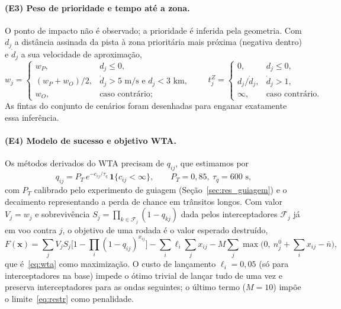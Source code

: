 \documentclass[11pt,a4paper]{article}
\begin{document}
\paragraph{(E3) Peso de prioridade e tempo até a zona.} O ponto de impacto não é observado; a prioridade é inferida pela
geometria. Com $d_j$ a distância assinada da pista à zona prioritária mais próxima (negativa dentro) e $\dot d_j$ a sua
velocidade de aproximação,
\begin{equation}
  w_j=\begin{cases} w_P, & d_j\le 0,\\ (w_P+w_O)/2, & \dot d_j>5\text{ m/s e } d_j<3\text{ km},\\ w_O, & \text{caso contrário;}\end{cases}
  \qquad
  t^Z_j=\begin{cases}0, & d_j\le0,\\ d_j/\dot d_j, & \dot d_j>1,\\ \infty,&\text{caso contrário.}\end{cases}
  \label{eq:peso}
\end{equation}
As fintas do conjunto de cenários foram desenhadas para enganar exatamente essa inferência.

\paragraph{(E4) Modelo de sucesso e objetivo WTA.} Os métodos derivados do WTA precisam de $q_{ij}$, que estimamos por
\begin{equation}
  q_{ij} = P_T\,e^{-c_{ij}/\tau_q}\,\mathbf{1}\{c_{ij}<\infty\},\qquad P_T=0{,}85,\ \tau_q=600\text{ s},
  \label{eq:q}
\end{equation}
com $P_T$ calibrado pelo experimento de guiagem (Seção~\ref{sec:res_guiagem}) e o decaimento representando a perda de
chance em trânsitos longos. Com valor $V_j=w_j$ e sobrevivência $S_j=\prod_{k\in\mathcal{F}_j}(1-q_{kj})$ dada pelos
interceptadores $\mathcal{F}_j$ já em voo contra $j$, o objetivo de uma rodada é o valor esperado destruído,
\begin{equation}
  F(\bm{x}) = \sum_j V_j S_j\Big[1-\prod_{i}(1-q_{ij})^{x_{ij}}\Big]
  - \sum_{i}\ell_i\sum_j x_{ij}
  - M\sum_j\max\!\Big(0,\ n_j^0+\sum_i x_{ij}-\bar n\Big),
  \label{eq:F}
\end{equation}
que é~\eqref{eq:wta} como maximização. O custo de lançamento $\ell_i=0{,}05$ (só para interceptadores na base) impede o
ótimo trivial de lançar tudo de uma vez e preserva interceptadores para as ondas seguintes; o último termo ($M=10$) impõe
o limite~\eqref{eq:restr} como penalidade.
\end{document}
